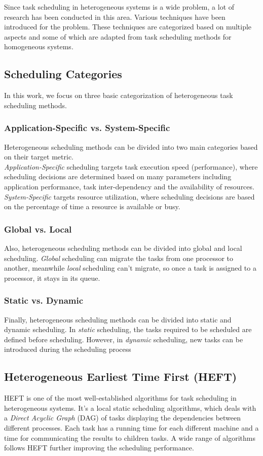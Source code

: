 Since task scheduling in heterogeneous systems is a wide problem, a lot of research has been conducted in this area. Various techniques have been introduced for the problem. These techniques are categorized based on multiple aspects \cite{inbook} and some of which are adapted from task scheduling methods for homogeneous systems.

\subsection{Scheduling Categories}
In this work, we focus on three basic categorization of heterogeneous task scheduling methods.

\subsubsection{Application-Specific vs. System-Specific}
Heterogeneous scheduling methods can be divided into two main categories based on their target metric.\\
\emph{Application-Specific} scheduling targets task execution speed (performance), where scheduling
decisions are determined based on many parameters including application performance, task inter-dependency and the availability of resources. \emph{System-Specific} targets resource utilization, where scheduling decisions are based on the percentage of time a resource is available or busy.

\subsubsection{Global vs. Local}
Also, heterogeneous scheduling methods can be divided into global and local scheduling. \emph{Global} scheduling can migrate the tasks from one processor to another, meanwhile \emph{local} scheduling can't migrate, so once a task is assigned to a processor, it stays in its queue.  

\subsubsection{Static vs. Dynamic}
Finally, heterogeneous scheduling methods can be divided into static and dynamic scheduling. In \emph{static} scheduling, the tasks required to be scheduled are defined before scheduling. However, in \emph{dynamic} scheduling, new tasks can be introduced during the scheduling process

\subsection{Heterogeneous Earliest Time First (HEFT)}
HEFT \cite{993206} is one of the most well-established algorithms for task scheduling in heterogeneous systems. It's a local static scheduling algorithms, which deals with a \emph{Direct Acyclic Graph} (DAG) of tasks displaying the dependencies between different processes. Each task has a running time for each different machine and a time for communicating the results to children tasks. A wide range of algorithms \cite{inbook} follows HEFT further improving the scheduling performance.

